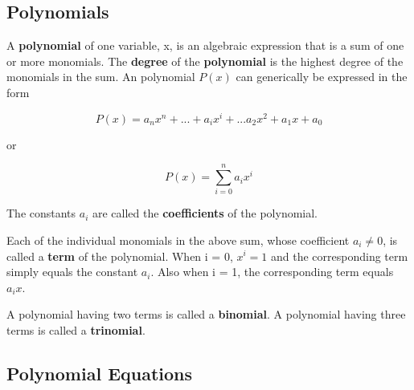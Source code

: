 \subsection{Polynomials}
\label{sss:poly-f9e4}




A \textbf{polynomial} of one variable, x, is an algebraic expression that is a sum of one
or more monomials. The \textbf{degree} of the \textbf{polynomial} is the highest degree of
the monomials in the sum. An polynomial $P(x)$ can generically be expressed in the form



$$P(x) = a _n x^n + ... + a _i x^i + ... a _2 x^2 + a _1 x + a _0 $$



or



$$P(x) = \sum _{i=0}^{n}a _ix^i$$



The constants $a _i$ are called the \textbf{coefficients} of the polynomial.



Each of the individual monomials in the above sum, whose coefficient $a _i \neq 0$, is
called a \textbf{term} of the polynomial. When i = 0, $x^i = 1$ and the corresponding term
simply equals the constant $a _i$. Also when i = 1, the corresponding term equals $a _i
x$.



A polynomial having two terms is called a \textbf{binomial}. A polynomial having three
terms is called a \textbf{trinomial}.




\subsection{Polynomial Equations}
\label{sss:poly-9a5b}




